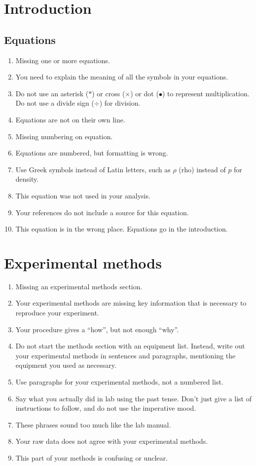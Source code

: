 \documentclass[12pt,letterpaper]{article}
\begin{document}
\begin{multicols}{2}
\section{Introduction}

\subsection*{Equations}

\begin{enumerate}[start=30]
  \item Missing one or more equations.
  \item You need to explain the meaning of all the symbols in your equations.
  \item Do not use an asterisk ($*$) or cross ($\times$) or dot ($\bullet$)
    to represent multiplication.
    Do not use a divide sign ($\div$) for division.
  \item Equations are not on their own line.
  \item Missing numbering on equation.
  \item Equations are numbered, but formatting is wrong.
  \item Use Greek symbols instead of Latin letters,
    such as $\rho$ (rho) instead of $p$ for density.
  \item This equation was not used in your analysis.
  \item Your references do not include a source for this equation.
  \item This equation is in the wrong place. Equations go in the introduction.
\end{enumerate}

\section{Experimental methods}

\begin{enumerate}[start=40]
  \item Missing an experimental methods section.
  \item Your experimental methods are missing key information
    that is necessary to reproduce your experiment.
  \item Your procedure gives a ``how'', but not enough ``why''.
  \item Do not start the methods section with an equipment list.
    Instead, write out your experimental methods in sentences and paragraphs,
    mentioning the equipment you used as necessary.
  \item Use paragraphs for your experimental methods, not a numbered list.
  \item Say what you actually did in lab using the past tense.
    Don't just give a list of instructions to follow,
    and do not use the imperative mood.
  \item These phrases sound too much like the lab manual.
  \item Your raw data does not agree with your experimental methods.
  \item This part of your methods is confusing or unclear.
\end{enumerate}


\end{multicols}
\end{document}
